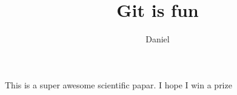 \documentclass[10pt]{article}
\author{Daniel}
\title{Git is fun}
\begin{document}
	\maketitle

	This is a super awesome scientific papar.
	I hope I win a prize
\end{document}
